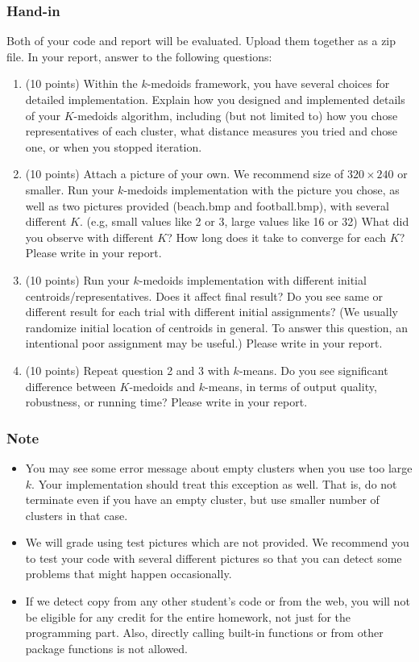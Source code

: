 \documentclass[twoside,10pt]{article}
\begin{document}
\subsubsection*{Hand-in}
Both of your code and report will be evaluated. Upload them together as a zip file. In your report, answer to the following questions:
\begin{enumerate}
  \item (10 points) Within the $k$-medoids framework, you have several choices for detailed implementation. Explain how you designed and implemented details of your $K$-medoids algorithm, including (but not limited to) how you chose representatives of each cluster, what distance measures you tried and chose one, or when you stopped iteration.
  \item (10 points) Attach a picture of your own. We recommend size of $320 \times 240$ or smaller. Run your $k$-medoids implementation with the picture you chose, as well as two pictures provided (\textsf{beach.bmp} and \textsf{football.bmp}), with several different $K$. (e.g, small values like 2 or 3, large values like 16 or 32) What did you observe with different $K$? How long does it take to converge for each $K$? Please write in your report. 
  \item (10 points) Run your $k$-medoids implementation with different initial centroids/representatives. Does it affect final result? Do you see same or different result for each trial with different initial assignments? (We usually randomize initial location of centroids in general. To answer this question, an intentional poor assignment may be useful.) Please write in your report. 
  \item (10 points) Repeat question 2 and 3 with $k$-means. Do you see significant difference between $K$-medoids and $k$-means, in terms of output quality, robustness, or running time? Please write in your report. 
\end{enumerate}


\subsubsection*{Note}
\begin{itemize}
  \item You may see some error message about empty clusters when you use too large $k$. Your implementation should treat this exception as well. That is, do not terminate even if you have an empty cluster, but use smaller number of clusters in that case.

  \item We will grade using test pictures which are not provided. We recommend you to test your code with several different pictures so that you can detect some problems that might happen occasionally. 

  \item If we detect copy from any other student's code or from the web, you will not be eligible for any credit for the entire homework, not just for the programming part. Also, directly calling built-in functions or from other package functions is not allowed.
\end{itemize}
\end{document}
